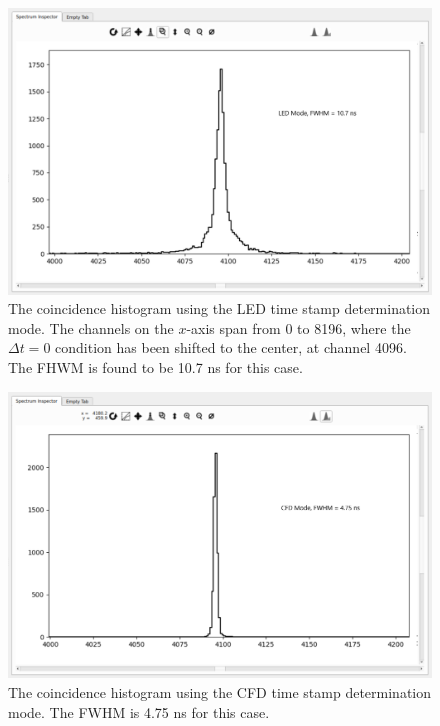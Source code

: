 \begin{figure}[!p]
\centering
\includegraphics[width=5in]{Chapter-5/figs/Co60_LED_Coin.png}
\caption{\label{fig:Co60_LED_Coin}The coincidence histogram using the LED time stamp determination mode. The channels on the $x$-axis span from 0 to 8196, where the $\Delta t = 0$ condition has been shifted to the center, at channel 4096. The FHWM is found to be 10.7 ns for this case.}
\end{figure}

\begin{figure}
\centering
\includegraphics[width=5in]{Chapter-5/figs/Co60_CFD_Coin.png}
\caption{\label{fig:Co60_CFD_Coin}The coincidence histogram using the CFD time stamp determination mode. The FWHM is 4.75 ns for this case.}
\end{figure}


